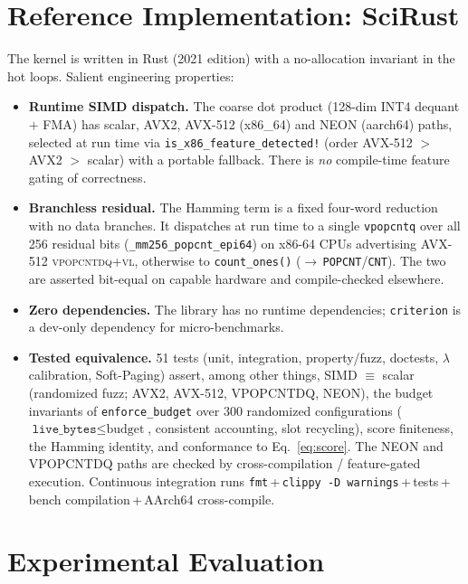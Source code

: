 \documentclass[11pt]{article}
\theoremstyle{plain}
\theoremstyle{definition}
\begin{document}
\section{Reference Implementation: SciRust}
\label{sec:impl}

The kernel is written in Rust (2021 edition) with a no-allocation
invariant in the hot loops. Salient engineering properties:

\begin{itemize}[leftmargin=1.4em,itemsep=2pt]
  \item \textbf{Runtime SIMD dispatch.} The coarse dot product (128-dim
    INT4 dequant $+$ FMA) has scalar, AVX2, AVX-512 (x86\_64) and NEON
    (aarch64) paths, selected at run time via
    \texttt{is\_x86\_feature\_detected!} (order AVX-512 $>$ AVX2 $>$
    scalar) with a portable fallback. There is \emph{no} compile-time
    feature gating of correctness.
  \item \textbf{Branchless residual.} The Hamming term is a fixed
    four-word reduction with no data branches. It dispatches at run time to
    a single \texttt{vpopcntq} over all 256 residual bits
    (\texttt{\_mm256\_popcnt\_epi64}) on x86-64 CPUs advertising AVX-512
    \textsc{vpopcntdq}+\textsc{vl}, otherwise to \texttt{count\_ones()}
    ($\to$\,\texttt{POPCNT}/\texttt{CNT}). The two are asserted bit-equal on
    capable hardware and compile-checked elsewhere.
  \item \textbf{Zero dependencies.} The library has no runtime
    dependencies; \texttt{criterion} is a dev-only dependency for
    micro-benchmarks.
  \item \textbf{Tested equivalence.} 51 tests (unit, integration,
    property/fuzz, doctests, $\lambda$ calibration, Soft-Paging) assert,
    among other things, SIMD $\equiv$ scalar (randomized fuzz; AVX2,
    AVX-512, VPOPCNTDQ, NEON), the budget invariants of
    \texttt{enforce\_budget} over 300 randomized configurations
    ($\texttt{live\_bytes}\le\text{budget}$, consistent accounting, slot
    recycling), score finiteness, the Hamming identity, and conformance to
    Eq.~\eqref{eq:score}. The NEON and VPOPCNTDQ paths are checked by
    cross-compilation / feature-gated execution. Continuous integration runs
    \texttt{fmt}\,+\,\texttt{clippy -D warnings}\,+\,tests\,+\,bench
    compilation\,+\,AArch64 cross-compile.
\end{itemize}

\section{Experimental Evaluation}
\label{sec:eval}
\end{document}
